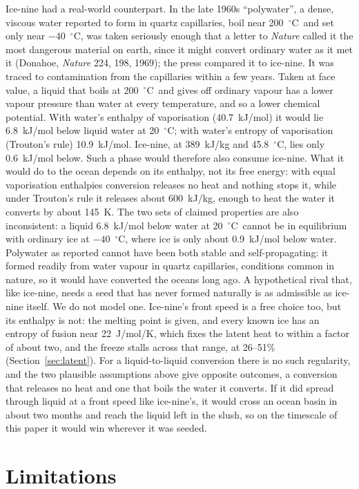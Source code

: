 \documentclass[11pt,a4paper]{article}
\newcommand{\degC}{$^{\circ}$C}
\begin{document}
Ice-nine had a real-world counterpart. In the late 1960s ``polywater'', a dense, viscous water reported to form in quartz capillaries, boil near 200~\degC\ and set only near $-40$~\degC, was taken seriously enough that a letter to \emph{Nature} called it the most dangerous material on earth, since it might convert ordinary water as it met it (Donahoe, \emph{Nature} 224, 198, 1969); the press compared it to ice-nine. It was traced to contamination from the capillaries within a few years. Taken at face value, a liquid that boils at 200~\degC\ and gives off ordinary vapour has a lower vapour pressure than water at every temperature, and so a lower chemical potential. With water's enthalpy of vaporisation (40.7~kJ/mol) it would lie 6.8~kJ/mol below liquid water at 20~\degC; with water's entropy of vaporisation (Trouton's rule) 10.9~kJ/mol. Ice-nine, at 389~kJ/kg and 45.8~\degC, lies only 0.6~kJ/mol below. Such a phase would therefore also consume ice-nine. What it would do to the ocean depends on its enthalpy, not its free energy: with equal vaporisation enthalpies conversion releases no heat and nothing stops it, while under Trouton's rule it releases about 600~kJ/kg, enough to heat the water it converts by about 145~K. The two sets of claimed properties are also inconsistent: a liquid 6.8~kJ/mol below water at 20~\degC\ cannot be in equilibrium with ordinary ice at $-40$~\degC, where ice is only about 0.9~kJ/mol below water. Polywater as reported cannot have been both stable and self-propagating: it formed readily from water vapour in quartz capillaries, conditions common in nature, so it would have converted the oceans long ago. A hypothetical rival that, like ice-nine, needs a seed that has never formed naturally is as admissible as ice-nine itself. We do not model one. Ice-nine's front speed is a free choice too, but its enthalpy is not: the melting point is given, and every known ice has an entropy of fusion near 22~J/mol/K, which fixes the latent heat to within a factor of about two, and the freeze stalls across that range, at 26--51\% (Section~\ref{sec:latent}). For a liquid-to-liquid conversion there is no such regularity, and the two plausible assumptions above give opposite outcomes, a conversion that releases no heat and one that boils the water it converts. If it did spread through liquid at a front speed like ice-nine's, it would cross an ocean basin in about two months and reach the liquid left in the slush, so on the timescale of this paper it would win wherever it was seeded.

\section{Limitations}
\end{document}
